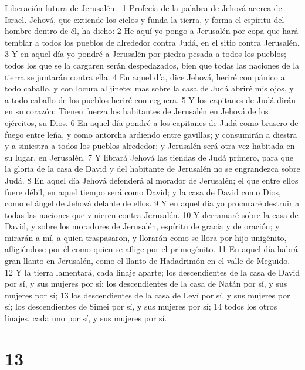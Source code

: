 Liberación futura de Jerusalén

1 Profecía de la palabra de Jehová acerca de Israel. Jehová, que extiende los cielos y funda la tierra, y forma el espíritu del hombre dentro de él, ha dicho:
2 He aquí yo pongo a Jerusalén por copa que hará temblar a todos los pueblos de alrededor contra Judá, en el sitio contra Jerusalén.
3 Y en aquel día yo pondré a Jerusalén por piedra pesada a todos los pueblos; todos los que se la cargaren serán despedazados, bien que todas las naciones de la tierra se juntarán contra ella.
4 En aquel día, dice Jehová, heriré con pánico a todo caballo, y con locura al jinete; mas sobre la casa de Judá abriré mis ojos, y a todo caballo de los pueblos heriré con ceguera.
5 Y los capitanes de Judá dirán en su corazón: Tienen fuerza los habitantes de Jerusalén en Jehová de los ejércitos, su Dios.
6 En aquel día pondré a los capitanes de Judá como brasero de fuego entre leña, y como antorcha ardiendo entre gavillas; y consumirán a diestra y a siniestra a todos los pueblos alrededor; y Jerusalén será otra vez habitada en su lugar, en Jerusalén.
7 Y librará Jehová las tiendas de Judá primero, para que la gloria de la casa de David y del habitante de Jerusalén no se engrandezca sobre Judá.
8 En aquel día Jehová defenderá al morador de Jerusalén; el que entre ellos fuere débil, en aquel tiempo será como David; y la casa de David como Dios, como el ángel de Jehová delante de ellos.
9 Y en aquel día yo procuraré destruir a todas las naciones que vinieren contra Jerusalén.
10 Y derramaré sobre la casa de David, y sobre los moradores de Jerusalén, espíritu de gracia y de oración; y mirarán a mí, a quien traspasaron, y llorarán como se llora por hijo unigénito, afligiéndose por él como quien se aflige por el primogénito.
11 En aquel día habrá gran llanto en Jerusalén, como el llanto de Hadadrimón en el valle de Meguido.
12 Y la tierra lamentará, cada linaje aparte; los descendientes de la casa de David por sí, y sus mujeres por sí; los descendientes de la casa de Natán por sí, y sus mujeres por sí;
13 los descendientes de la casa de Leví por sí, y sus mujeres por sí; los descendientes de Simei por sí, y sus mujeres por sí;
14 todos los otros linajes, cada uno por sí, y sus mujeres por sí.

\chapter{13}


